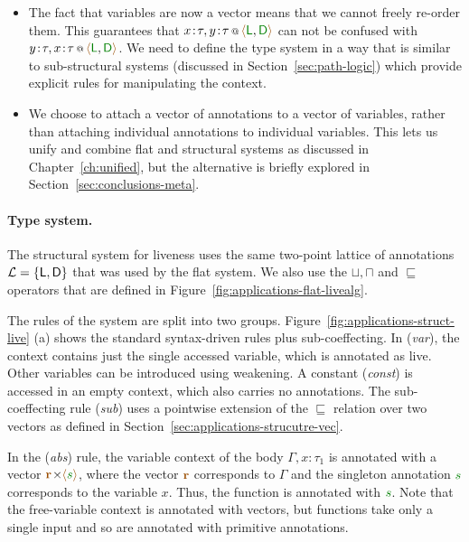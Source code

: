 \begin{itemize}
\item The fact that variables are now a vector means that we cannot freely re-order them. This
  guarantees that $\coctx{x\!:\!\tau, y\!:\!\tau}{\alift{\cclrd{\ident{L}}, \cclrd{\ident{D}}}}$
  can not be confused with $\coctx{y\!:\!\tau, x\!:\!\tau}{\alift{\cclrd{\ident{L}}, \cclrd{\ident{D}}}}$.
  We need to define the type system in a way that is similar to sub-structural systems 
  (discussed in Section~\ref{sec:path-logic}) which provide explicit rules for manipulating
  the context. 

\item We choose to attach a vector of annotations to a vector of variables, rather than attaching
  individual annotations to individual variables. This lets us unify and combine flat and 
  structural systems as discussed in Chapter~\ref{ch:unified}, but the alternative is briefly
  explored in Section~\ref{sec:conclusions-meta}.
\end{itemize}

\paragraph{Type system.}
The structural system for liveness uses the same two-point lattice of annotations
$\mathcal{L}=\{ \ident{L}, \ident{D} \}$ that was used by the flat system. We also use the
$\sqcup, \sqcap$ and $\sqsubseteq$ operators that are defined in Figure~\ref{fig:applications-flat-livealg}.

The rules of the system are split into two groups. Figure~\ref{fig:applications-struct-live} (a) shows 
the standard syntax-driven rules plus sub-coeffecting. In (\emph{var}), the context contains just the 
single accessed variable, which is annotated as live. Other variables can be introduced using weakening. 
A constant (\emph{const}) is accessed in an empty context, which also carries no annotations. The
sub-coeffecting rule (\emph{sub}) uses a pointwise extension of the $\sqsubseteq$ relation over two
vectors as defined in Section~\ref{sec:applications-strucutre-vec}.

In the (\emph{abs}) rule, the variable context of the body $\Gamma, x\!:\!\tau_1$ is annotated with
a vector $\mathbf{\aclrd{r}}\cons\alift{\cclrd{s}}$, where the vector $\mathbf{\aclrd{r}}$ corresponds
to $\Gamma$ and the singleton annotation $\cclrd{s}$ corresponds to the variable $x$. Thus, the
function is annotated with $\cclrd{s}$. Note that the free-variable context is annotated with vectors,
but functions take only a single input and so are annotated with primitive annotations.


